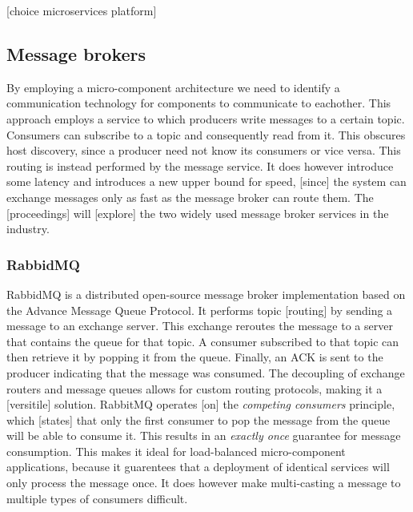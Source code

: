 [choice microservices platform]

\subsection{Message brokers}
By employing a micro-component architecture we need to identify a communication technology for components to communicate to eachother. This approach employs a service to which producers write messages to a certain topic. Consumers can subscribe to a topic and consequently read from it. This obscures host discovery, since a producer need not know its consumers or vice versa. This routing is instead performed by the message service. It does however introduce some latency and introduces a new upper bound for speed, [since] the system can exchange messages only as fast as the message broker can route them. The [proceedings] will [explore] the two widely used message broker services in the industry.

\subsubsection{RabbidMQ}
RabbidMQ is a distributed open-source message broker implementation based on the Advance Message Queue Protocol. It performs topic [routing] by sending a message to an exchange server. This exchange reroutes the message to a server that contains the queue for that topic. A consumer subscribed to that topic can then retrieve it by popping it from the queue. Finally, an ACK is sent to the producer indicating that the message was consumed. The decoupling of exchange routers and message queues allows for custom routing protocols, making it a [versitile] solution. RabbitMQ operates [on] the \emph{competing consumers} principle, which [states] that only the first consumer to pop the message from the queue will be able to consume it. This results in an \emph{exactly once} guarantee for message consumption. This makes it ideal for load-balanced micro-component applications, because it guarentees that a deployment of identical services will only process the message once. It does however make multi-casting a message to multiple types of consumers difficult.

